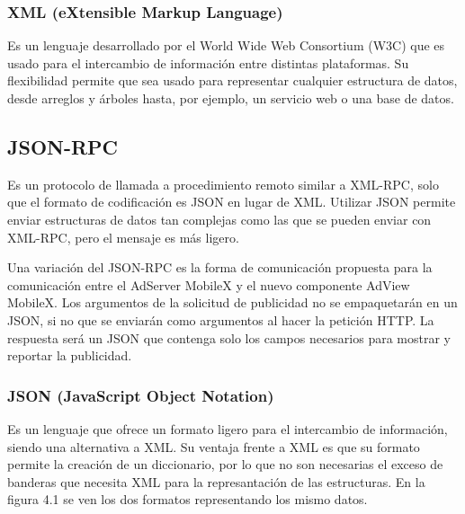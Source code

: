 \subsubsection{XML (eXtensible Markup Language) }

Es un lenguaje desarrollado por el World Wide Web Consortium (W3C)
que es usado para el intercambio de información entre distintas plataformas.
Su flexibilidad permite que sea usado para representar cualquier estructura
de datos, desde arreglos y árboles hasta, por ejemplo, un servicio
web o una base de datos. 


\subsection{JSON-RPC}

Es un protocolo de llamada a procedimiento remoto similar a XML-RPC,
solo que el formato de codificación es JSON en lugar de XML. Utilizar
JSON permite enviar estructuras de datos tan complejas como las que
se pueden enviar con XML-RPC, pero el mensaje es más ligero. \cite{Cap4.JSONRPC}

Una variación del JSON-RPC es la forma de comunicación propuesta para
la comunicación entre el AdServer MobileX y el nuevo componente AdView
MobileX. Los argumentos de la solicitud de publicidad no se empaquetarán
en un JSON, si no que se enviarán como argumentos al hacer la petición
HTTP. La respuesta será un JSON que contenga solo los campos necesarios
para mostrar y reportar la publicidad.


\subsubsection{JSON (JavaScript Object Notation) }

Es un lenguaje que ofrece un formato ligero para el intercambio de
información, siendo una alternativa a XML. Su ventaja frente a XML
es que su formato permite la creación de un diccionario, por lo que
no son necesarias el exceso de banderas que necesita XML para la represantación
de las estructuras. En la figura 4.1 se ven los dos formatos representando
los mismo datos.

\begin{center}
\begin{figure}[h]
\centering{}%
\end{figure}

\par\end{center}

\newpage{}
